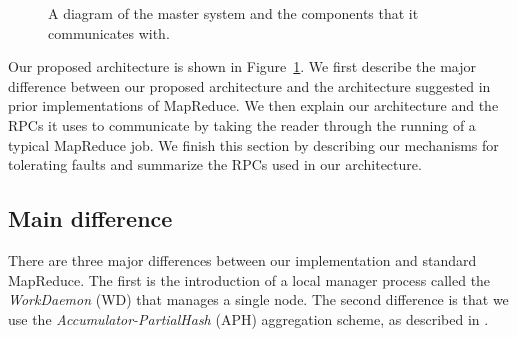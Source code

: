 \documentclass[10pt,letter,final,article,twocolumn]{article} %
\begin{document}
\begin{figure}[htbp]
\begin{center}
\caption{A diagram of the master system and the components that it communicates with.}
\label{fig:arch}
\end{center}
\end{figure}


Our proposed architecture is shown in Figure~\ref{fig:arch}. We first describe the major difference between our proposed architecture and the architecture suggested in prior implementations of MapReduce. We then explain our architecture and the RPCs it uses to communicate by taking the reader through the running of a typical MapReduce job. We finish this section by describing our mechanisms for tolerating faults and summarize the RPCs used in our architecture.

\subsection{Main difference}

There are three major differences between our implementation and standard MapReduce. The first is the introduction of a local manager process called the \emph{WorkDaemon} (WD) that manages a single node. The second difference is that we use the \emph{Accumulator-PartialHash} (APH) aggregation scheme, as described in \citet{yu2009distributed}.
\end{document}
